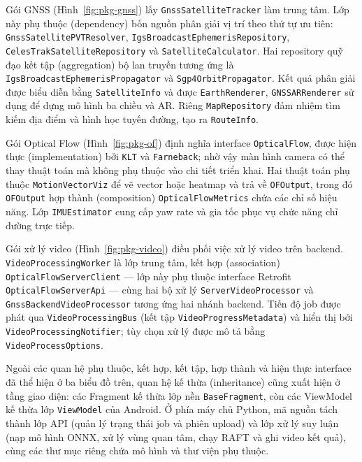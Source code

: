 \documentclass[../DoAn.tex]{subfiles}
\begin{document}
Gói GNSS (Hình~\ref{fig:pkg-gnss}) lấy \texttt{GnssSatelliteTracker} làm trung tâm. Lớp này phụ thuộc (dependency) bốn nguồn phân giải vị trí theo thứ tự ưu tiên: \texttt{GnssSatellitePVTResolver}, \texttt{IgsBroadcastEphemerisRepository}, \texttt{CelesTrakSatelliteRepository} và \texttt{SatelliteCalculator}. Hai repository quỹ đạo kết tập (aggregation) bộ lan truyền tương ứng là \texttt{IgsBroadcastEphemerisPropagator} và \texttt{Sgp4OrbitPropagator}. Kết quả phân giải được biểu diễn bằng \texttt{SatelliteInfo} và được \texttt{EarthRenderer}, \texttt{GNSSARRenderer} sử dụng để dựng mô hình ba chiều và AR. Riêng \texttt{MapRepository} đảm nhiệm tìm kiếm địa điểm và hình học tuyến đường, tạo ra \texttt{RouteInfo}.

\FloatBarrier

Gói Optical Flow (Hình~\ref{fig:pkg-of}) định nghĩa interface \texttt{OpticalFlow}, được hiện thực (implementation) bởi \texttt{KLT} và \texttt{Farneback}; nhờ vậy màn hình camera có thể thay thuật toán mà không phụ thuộc vào chi tiết triển khai. Hai thuật toán phụ thuộc \texttt{MotionVectorViz} để vẽ vector hoặc heatmap và trả về \texttt{OFOutput}, trong đó \texttt{OFOutput} hợp thành (composition) \texttt{OpticalFlowMetrics} chứa các chỉ số hiệu năng. Lớp \texttt{IMUEstimator} cung cấp yaw rate và gia tốc phục vụ chức năng chỉ đường trực tiếp.

\FloatBarrier

Gói xử lý video (Hình~\ref{fig:pkg-video}) điều phối việc xử lý video trên backend. \texttt{VideoProcessingWorker} là lớp trung tâm, kết hợp (association) \texttt{OpticalFlowServerClient} --- lớp này phụ thuộc interface Retrofit \texttt{OpticalFlowServerApi} --- cùng hai bộ xử lý \texttt{ServerVideoProcessor} và \texttt{GnssBackendVideoProcessor} tương ứng hai nhánh backend. Tiến độ job được phát qua \texttt{VideoProcessingBus} (kết tập \texttt{VideoProgressMetadata}) và hiển thị bởi \texttt{VideoProcessingNotifier}; tùy chọn xử lý được mô tả bằng \texttt{VideoProcessOptions}.


Ngoài các quan hệ phụ thuộc, kết hợp, kết tập, hợp thành và hiện thực interface đã thể hiện ở ba biểu đồ trên, quan hệ kế thừa (inheritance) cũng xuất hiện ở tầng giao diện: các Fragment kế thừa lớp nền \texttt{BaseFragment}, còn các ViewModel kế thừa lớp \texttt{ViewModel} của Android. Ở phía máy chủ Python, mã nguồn tách thành lớp API (quản lý trạng thái job và phiên upload) và lớp xử lý suy luận (nạp mô hình ONNX, xử lý vùng quan tâm, chạy RAFT và ghi video kết quả), cùng các thư mục riêng chứa mô hình và thư viện phụ thuộc.
\end{document}
